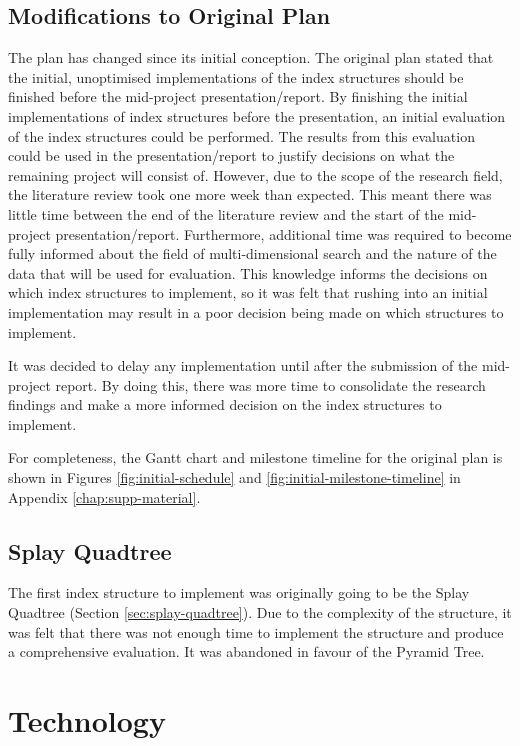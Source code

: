 \subsection{Modifications to Original Plan}

The plan has changed since its initial conception. The original plan stated that the initial, unoptimised implementations of the index structures should be finished before the mid-project presentation/report. By finishing the initial implementations of index structures before the presentation, an initial evaluation of the index structures could be performed. The results from this evaluation could be used in the presentation/report to justify decisions on what the remaining project will consist of. However, due to the scope of the research field, the literature review took one more week than expected. This meant there was little time between the end of the literature review and the start of the mid-project presentation/report. Furthermore, additional time was required to become fully informed about the field of multi-dimensional search and the nature of the data that will be used for evaluation. This knowledge informs the decisions on which index structures to implement, so it was felt that rushing into an initial implementation may result in a poor decision being made on which structures to implement. 

It was decided to delay any implementation until after the submission of the mid-project report. By doing this, there was more time to consolidate the research findings and make a more informed decision on the index structures to implement.

For completeness, the Gantt chart and milestone timeline for the original plan is shown in Figures \ref{fig:initial-schedule} and \ref{fig:initial-milestone-timeline} in Appendix \ref{chap:supp-material}.

\subsection{Splay Quadtree}

The first index structure to implement was originally going to be the Splay Quadtree (Section \ref{sec:splay-quadtree}). Due to the complexity of the structure, it was felt that there was not enough time to implement the structure and produce a comprehensive evaluation. It was abandoned in favour of the Pyramid Tree.

\section{Technology}

